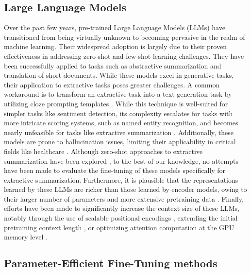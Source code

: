 \subsection{Large Language Models}

Over the past few years, pre-trained Large Language Models (LLMs) have transitioned from being virtually unknown to becoming pervasive in the realm of machine learning. Their widespread adoption is largely due to their proven effectiveness in addressing zero-shot and few-shot learning challenges. They have been successfully applied to tasks such as abstractive summarization and translation of short documents. While these models excel in generative tasks, their application to extractive tasks poses greater challenges. A common workaround is to transform an extractive task into a text generation task by utilizing cloze prompting templates \cite{pretrainprompt}. While this technique is well-suited for simpler tasks like sentiment detection, its complexity escalates for tasks with more intricate scoring systems, such as named entity recognition, and becomes nearly unfeasible for tasks like extractive summarization \cite{2023arXiv230410428WGPTNER}. Additionally, these models are prone to hallucination issues, limiting their applicability in critical fields like healthcare \cite{kaddour2023challenges}. Although zero-shot approaches to extractive summarization have been explored \cite{zhang2023extractivegpt}, to the best of our knowledge, no attempts have been made to evaluate the fine-tuning of these models specifically for extractive summarization. Furthermore, it is plausible that the representations learned by these LLMs are richer than those learned by encoder models, owing to their larger number of parameters and more extensive pretraining data \cite{ni-etal-2022-sentence}. Finally, efforts have been made to significantly increase the context size of these LLMs, notably through the use of scalable positional encodings \cite{Rotaryrope}, extending the initial pretraining context length \cite{chen2023extendingPI}, or optimizing attention computation at the GPU memory level \cite{dao2022flashattention,dao2023flashattention2}.

\subsection{Parameter-Efficient Fine-Tuning methods}

